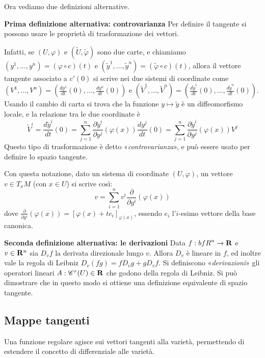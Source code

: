 \documentclass{article}
\newcommand{\PHI}{\varphi}
\newcommand{\composto}{\circ}
\newcommand{\cors}[1]{\textit{#1}}%
\newcommand{\ci}[1]{\mathscr{#1}}%
\newcommand{\di}{\partial}
\begin{document}
 Ora vediamo due definizioni alternative.
 
 \begin{paragraph}
  {\bf  Prima definizione alternativa: controvarianza} Per definire il tangente si possono
  usare le proprietà di trasformazione dei vettori.
  
  Infatti, se $(U,\PHI)$ e $(\tilde{U},\tilde{\PHI})$ sono due carte, e chiamiamo
  $(y^1,\dots,y^n)=(\PHI\composto c)(t)$ e $(\tilde{y}^1,\dots,\tilde{y}^n)=(\tilde{\PHI}\composto c)(t)$,
  allora il vettore tangente associato a $c'(0)$ si scrive nei due sistemi di coordinate
  come $(V^1,\dots,V^n)=(\frac{dy^1}{dt}(0),\dots,\frac{dy^n}{dt}(0))$ e
  $(\tilde{V}^1,\dots,\tilde{V}^n)=(\frac{d\tilde{y}^1}{dt}(0),\dots,\frac{d\tilde{y}^n}{dt}(0))$.
  Usando il cambio di carta si trova che la funzione $y\mapsto\tilde{y}$ è un diffeomorfismo
  locale, e la relazione tra le due coordinate è
  $$\tilde{V}^i=\frac{d\tilde{y}^i}{dt}(0)=\sum_{j=1}^n\frac{\di\tilde{y}^i}{\di y^j}(\PHI(x))
  \frac{dy^j}{dt}(0)=\sum_{j=1}^n\frac{\di\tilde{y}^i}{\di y^j}(\PHI(x))V^j$$
  Questo tipo di trasformazione è detto «\cors{controvarianza}», e può essere usato per
  definire lo spazio tangente.
  
  Con questa notazione, dato un sistema di coordinate $(U,\PHI)$, un vettore $v\in T_x M$
  (con $x\in U$) si scrive così:
  $$v=\sum_{i=1}^nv^i\frac{\di}{\di y^i}(\PHI(x))$$
  dove $\frac{\di}{\di y^i}(\PHI(x))=[\PHI(x)+te_i]_{\PHI(x)}$, essendo $e_i$ l'$i$-esimo
  vettore della base canonica.
 \end{paragraph}

 \begin{paragraph}
  {\bf  Seconda definizione alternativa: le derivazioni} Data $f:{bf R }^n\to{\bf R}$
  e $v\in{\bf R}^n$ sia $D_vf$ la derivata direzionale lungo $v$. Allora $D_v$ è lineare
  in $f$, ed inoltre vale la regola di Leibniz $D_v(fg)=fD_vg+gD_vf$. Si definiscono
  «\cors{derivazioni}» gli operatori lineari $A:\ci{C}^r(U)\in{\bf R}$ che godono della
  regola di Leibniz. Si può dimostrare che in questo modo si ottiene una definizione
  equivalente di spazio tangente.
  \end{paragraph}
 
 \subsection{ Mappe tangenti}
 
 Una funzione regolare agisce sui vettori tangenti alla varietà, permettendo di estendere
 il concetto di differenziale alle varietà.
 
\end{document}
